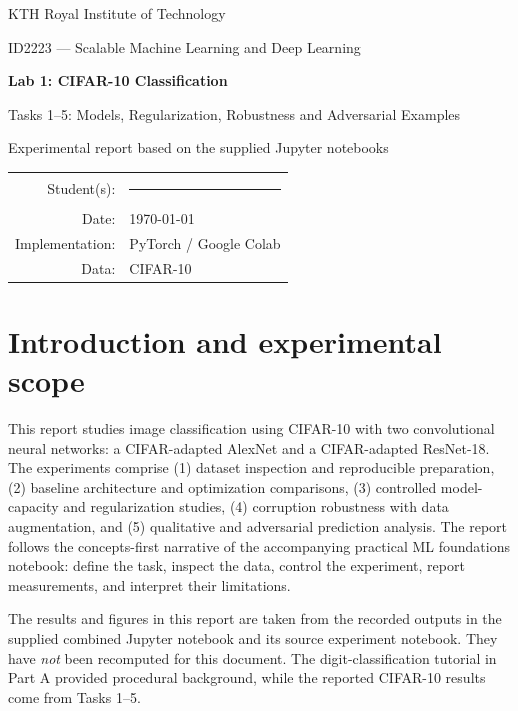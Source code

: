 \documentclass[11pt,a4paper]{article}
\begin{document}
\begin{titlepage}
\centering
\vspace*{28mm}
{\Large KTH Royal Institute of Technology\par}
\vspace{8mm}
{\large ID2223 --- Scalable Machine Learning and Deep Learning\par}
\vspace{20mm}
{\Huge\bfseries Lab 1: CIFAR-10 Classification\par}
\vspace{6mm}
{\LARGE Tasks 1--5: Models, Regularization, Robustness and Adversarial Examples\par}
\vspace{20mm}
{\large Experimental report based on the supplied Jupyter notebooks\par}
\vfill
\begin{tabular}{rl}
Student(s): & \rule{85mm}{0.4pt}\\[5mm]
Date: & \today\\[5mm]
Implementation: & PyTorch / Google Colab\\
Data: & CIFAR-10\\
\end{tabular}
\vspace{25mm}
\end{titlepage}
\tableofcontents
\newpage

\section{Introduction and experimental scope}
This report studies image classification using CIFAR-10 with two convolutional neural networks: a CIFAR-adapted AlexNet and a CIFAR-adapted ResNet-18. The experiments comprise (1) dataset inspection and reproducible preparation, (2) baseline architecture and optimization comparisons, (3) controlled model-capacity and regularization studies, (4) corruption robustness with data augmentation, and (5) qualitative and adversarial prediction analysis. The report follows the concepts-first narrative of the accompanying practical ML foundations notebook: define the task, inspect the data, control the experiment, report measurements, and interpret their limitations.

The results and figures in this report are taken from the recorded outputs in the supplied combined Jupyter notebook and its source experiment notebook. They have \emph{not} been recomputed for this document. The digit-classification tutorial in Part A provided procedural background, while the reported CIFAR-10 results come from Tasks 1--5.
\end{document}
